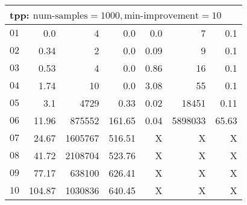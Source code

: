 \begin{longtable}{|c||r|r|r||r|r|r|}
\multicolumn{7}{|l|}{tpp: $\text{num-samples}=1000,\text{min-improvement}=10$}\\\hline
$01$ & 0.0 & 4 & 0.0 & 0.0 & 7 & 0.1 \\\hline
$02$ & 0.34 & 2 & 0.0 & 0.09 & 9 & 0.1 \\\hline
$03$ & 0.53 & 4 & 0.0 & 0.86 & 16 & 0.1 \\\hline
$04$ & 1.74 & 10 & 0.0 & 3.08 & 55 & 0.1 \\\hline
$05$ & 3.1 & 4729 & 0.33 & 0.02 & 18451 & 0.11 \\\hline
$06$ & 11.96 & 875552 & 161.65 & 0.04 & 5898033 & 65.63 \\\hline
$07$ & 24.67 & 1605767 & 516.51 & X & X & X \\\hline
$08$ & 41.72 & 2108704 & 523.76 & X & X & X \\\hline
$09$ & 77.17 & 638100 & 626.41 & X & X & X \\\hline
$10$ & 104.87 & 1030836 & 640.45 & X & X & X \\\hline

\end{longtable}